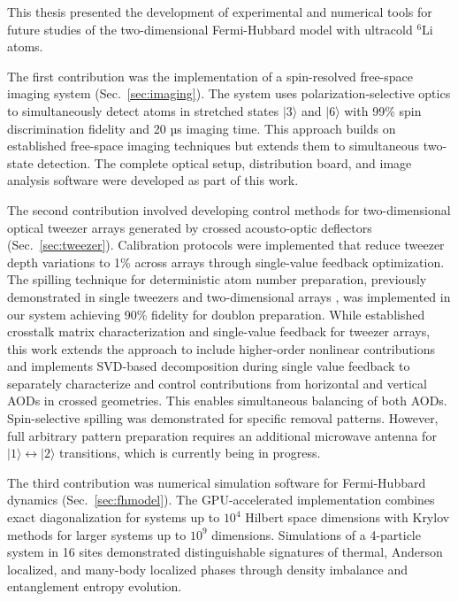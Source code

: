 
This thesis presented the development of experimental and numerical tools for future studies of the two-dimensional Fermi-Hubbard model with ultracold $^6$Li atoms.

The first contribution was the implementation of a spin-resolved free-space imaging system (Sec.~\ref{sec:imaging}). The system uses polarization-selective optics to simultaneously detect atoms in stretched states $|3\rangle$ and $|6\rangle$ with 99\% spin discrimination fidelity and 20 µs imaging time. This approach builds on established free-space imaging techniques \cite{bergschneider_spin-resolved_2018,su_fast_2025} but extends them to simultaneous two-state detection. The complete optical setup, distribution board, and image analysis software were developed as part of this work.

The second contribution involved developing control methods for two-dimensional optical tweezer arrays generated by crossed acousto-optic deflectors (Sec.~\ref{sec:tweezer}). Calibration protocols were implemented that reduce tweezer depth variations to 1\% across arrays through single-value feedback optimization. The spilling technique for deterministic atom number preparation, previously demonstrated in single tweezers \cite{serwane_deterministic_2011,holten_observation_2021} and two-dimensional arrays \cite{spar_programmable_2024}, was implemented in our system achieving 90\% fidelity for doublon preparation. While \cite{spar_programmable_2024} established crosstalk matrix characterization and single-value feedback for tweezer arrays, this work extends the approach to include higher-order nonlinear contributions and implements SVD-based decomposition during single value feedback to separately characterize and control contributions from horizontal and vertical AODs in crossed geometries. This enables simultaneous balancing of both AODs. Spin-selective spilling was demonstrated for specific removal patterns. However, full arbitrary pattern preparation requires an additional microwave antenna for $|1\rangle \leftrightarrow |2\rangle$ transitions, which is currently being in progress.

The third contribution was numerical simulation software for Fermi-Hubbard dynamics (Sec.~\ref{sec:fhmodel}). The GPU-accelerated implementation combines exact diagonalization for systems up to $10^4$ Hilbert space dimensions with Krylov methods for larger systems up to $10^9$ dimensions. Simulations of a 4-particle system in 16 sites demonstrated distinguishable signatures of thermal, Anderson localized, and many-body localized phases through density imbalance and entanglement entropy evolution.

